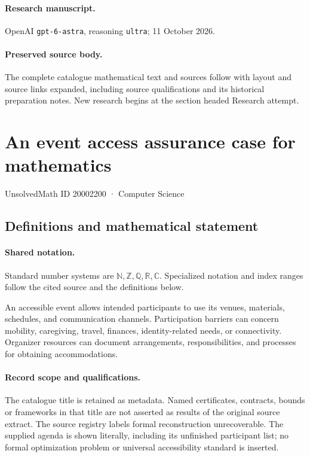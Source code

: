 \documentclass[11pt]{article}
\begin{document}
\paragraph{Research manuscript.} OpenAI \texttt{gpt-6-astra}, reasoning \texttt{ultra}; 11 October 2026.
\paragraph{Preserved source body.} The complete catalogue mathematical text and sources follow with layout and source links expanded, including source qualifications and its historical preparation notes. New research begins at the section headed Research attempt.

\section{An event access assurance case for mathematics}\label{20002200}
{\small UnsolvedMath ID 20002200 · Computer Science}
\subsection{Definitions and mathematical statement}

\paragraph{Shared notation.}Standard number systems are $\mathbb N,\mathbb Z,\mathbb Q,\mathbb R,\mathbb C$. Specialized notation and index ranges follow the cited source and the definitions below.


An accessible event allows intended participants to use its venues, materials, schedules, and communication channels. Participation barriers can concern mobility, caregiving, travel, finances, identity-related needs, or connectivity. Organizer resources can document arrangements, responsibilities, and processes for obtaining accommodations.
\paragraph{Record scope and qualifications.}
The catalogue title is retained as metadata. Named certificates, contracts, bounds or frameworks in that title are not asserted as results of the original source extract.
The source registry labels formal reconstruction unrecoverable. The supplied agenda is shown literally, including its unfinished participant list; no formal optimization problem or universal accessibility standard is inserted.
\end{document}
